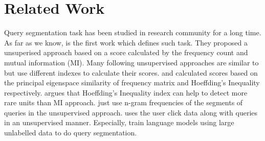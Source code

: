 \section{Related Work}
\label{sec:related}




Query segmentation task has been studied in research community for a long time. As far as we know, \cite{risvik_query_2003} is the first work which defines such task. They proposed a unsuperised approach based on a score calculated by the frequency count and mutual information (MI). Many following unsupervised approaches \cite{zhang_query_2009,kiseleva_unsupervised_2010,mishra_unsupervised_2011,hagen_power_2010,hagen_query_2011,parikh_segmentation_2013} are similar to \cite{risvik_query_2003} but use different indexes to calculate their scores. \cite{zhang_query_2009} and \cite{mishra_unsupervised_2011} calculated scores based on the principal eigenspace similarity of frequency matrix and Hoeffding’s Inequality respectively. \cite{mishra_unsupervised_2011} argues that Hoeffding’s Inequality index can help to detect more rare units than MI approach. \cite{hagen_power_2010,hagen_query_2011,parikh_segmentation_2013} just use n-gram frequencies of the segments of queries in the unsupervised approach. \cite{kiseleva_unsupervised_2010} uses the user click data along with queries in an unsupervised manner. Especially, \cite{tan_unsupervised_2008,huang_exploring_2010} train language models using large unlabelled data to do query segmentation.

